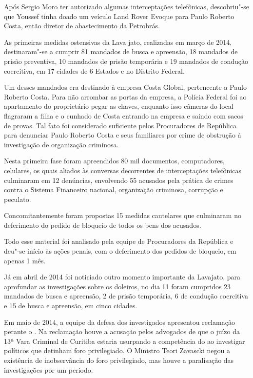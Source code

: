 Após Sergio Moro ter autorizado algumas interceptações telefônicas,
descobriu"-se que Youssef tinha doado um veículo Land Rover Evoque para
Paulo Roberto Costa, então diretor de abastecimento da Petrobrás.

As primeiras medidas ostensivas da Lava jato, realizadas em março de
2014, destinaram"-se a cumprir 81 mandados de busca e apreensão, 18
mandados de prisão preventiva, 10 mandados de prisão temporária e 19
mandados de condução coercitiva, em 17 cidades de 6 Estados e no
Distrito Federal.

Um desses mandados era destinado à empresa Costa Global, pertencente a
Paulo Roberto Costa. Para não arrombar as portas da empresa, a Polícia
Federal foi ao apartamento do proprietário pegar as chaves, enquanto
isso câmeras do local flagraram a filha e o cunhado de Costa entrando na
empresa e saindo com sacos de provas. Tal fato foi considerado
suficiente pelos Procuradores de República para denunciar Paulo Roberto
Costa e seus familiares por crime de obstrução à investigação de
organização criminosa.

Nesta primeira fase foram apreendidos 80 mil documentos, computadores,
celulares, os quais aliados às conversas decorrentes de interceptações
telefônicas culminaram em 12 denúncias, envolvendo 55 acusados pela
prática de crimes contra o Sistema Financeiro nacional, organização
criminosa, corrupção e peculato.

Concomitantemente foram propostas 15 medidas cautelares que culminaram
no deferimento do pedido de bloqueio de todos os bens dos acusados.

Todo esse material foi analisado pela equipe de Procuradores da
República e deu"-se início às ações penais, com o deferimento dos pedidos
de bloqueio, em apenas 1 mês.

Já em abril de 2014 foi noticiado outro momento importante da Lavajato,
para aprofundar as investigações sobre os doleiros, no dia 11 foram
cumpridos 23 mandados de busca e apreensão, 2 de prisão temporária, 6 de
condução coercitiva e 15 de busca e apreensão, em cinco cidades.

Em maio de 2014, a equipe da defesa dos investigados apresentou
reclamação perante o . Na reclamação houve a acusação pelos advogados
de que o juízo da 13ª Vara Criminal de Curitiba estaria usurpando a
competência do  ao investigar políticos que detinham foro
privilegiado. O Ministro Teori Zavascki negou a existência de
inobservância do foro privilegiado, mas houve a paralisação das
investigações por um período.

